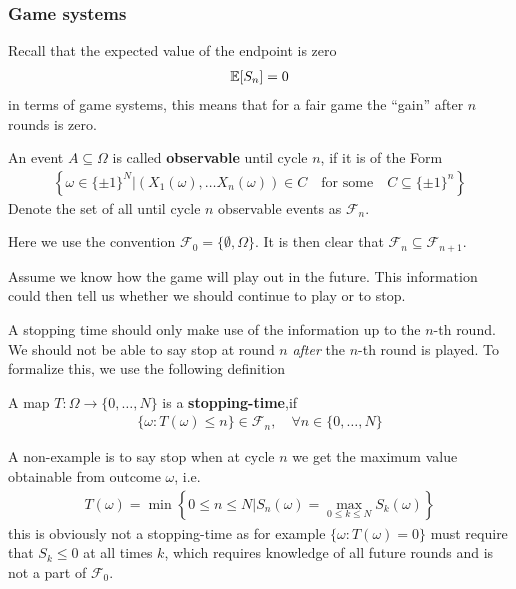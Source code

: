 \subsubsection{Game systems}
Recall that the expected value of the endpoint is zero
\begin{align*}
  \mathbb{E}[S_n] = 0
\end{align*}
in terms of game systems, this means that for a fair game the ``gain'' after $n$ rounds is zero.

\begin{dfn}[]
An event $A \subseteq \Omega$ is called \textbf{observable} until cycle $n$, if it is of the Form
\begin{align*}
  \left\{
    \omega \in \{\pm 1\}^{N} \big\vert (X_1(\omega), \ldots X_n(\omega)) \in C \quad \text{for some} \quad C \subseteq \{\pm 1\}^{n}
  \right\}
\end{align*}
Denote the set of all until cycle $n$ observable events as $\mathcal{F}_n$.
\end{dfn}
Here we use the convention $\mathcal{F}_0 = \{\emptyset, \Omega\}$. It is then clear that $\mathcal{F}_{n} \subseteq \mathcal{F}_{n+1}$.

Assume we know how the game will play out in the future. This information could then tell us whether we should continue to play or to stop. 

A stopping time should only make use of the information up to the $n$-th round. We should not be able to say stop at round $n$ \emph{after} the $n$-th round is played.
To formalize this, we use the following definition
\begin{dfn}[]
A map $T: \Omega \to \{0, \ldots, N\}$ is a \textbf{stopping-time},if
\begin{align*}
  \{\omega: T(\omega) \leq n\} \in \mathcal{F}_n, \quad \forall n \in \{0, \ldots, N\}
\end{align*}
\end{dfn}

\begin{ex}[]
A non-example is to say stop when at cycle $n$ we get the maximum value obtainable from outcome $\omega$, i.e.
\begin{align*}
  T(\omega) = \min\left\{
    0 \leq n \leq N \big\vert S_n(\omega) = \max_{0 \leq k \leq N}S_k(\omega)
  \right\}
\end{align*}
this is obviously not a stopping-time as for example $\{\omega: T(\omega) = 0\}$ must require that $S_k \leq 0$ at all times $k$, which requires knowledge of all future rounds and is not a part of $\mathcal{F}_0$.
\end{ex}

